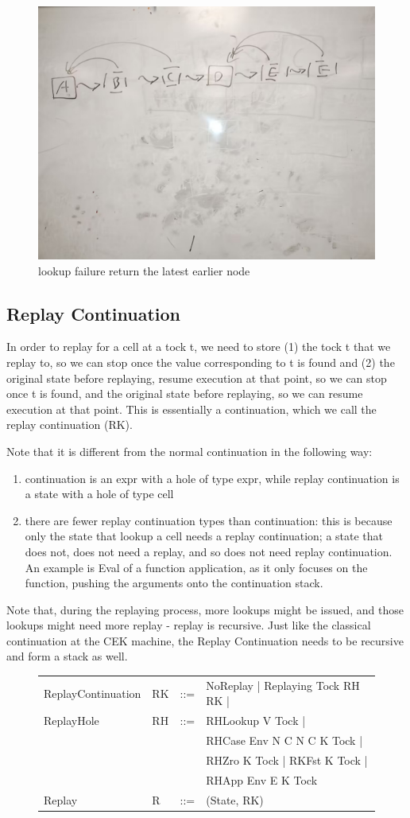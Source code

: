 \begin{figure}
    \includegraphics[width=0.5\columnwidth]{img4}
    \caption{lookup failure return the latest earlier node}
\end{figure}

\subsection{Replay Continuation}
In order to replay for a cell at a tock t, we need to store (1) the tock t that we replay to, so we can stop once the value corresponding to t is found and (2) the original state before replaying, resume execution at that point, so we can stop once t is found, and the original state before replaying, so we can resume execution at that point. 
This is essentially a continuation, which we call the replay continuation (RK).

Note that it is different from the normal continuation in the following way:
\begin{enumerate}
    \item continuation is an expr with a hole of type expr, while replay continuation is a state with a hole of type cell
    \item there are fewer replay continuation types than continuation: this is because only the state that lookup a cell needs a replay continuation; a state that does not, does not need a replay, and so does not need replay continuation. An example is Eval of a function application, as it only focuses on the function, pushing the arguments onto the continuation stack. 
\end{enumerate}

Note that, during the replaying process, more lookups might be issued, and those lookups might need more replay - replay is recursive. Just like the classical continuation at the CEK machine, the Replay Continuation needs to be recursive and form a stack as well.
\begin{figure}
    \begin{tabular}{p{10em} p{2.6em} p{1em} p{}}
        ReplayContinuation & RK & ::= & NoReplay | Replaying Tock RH RK | \\
        ReplayHole & RH & ::= & RHLookup V Tock | \\
        & & & RHCase Env N C N C K Tock | \\
        & & & RHZro K Tock | RKFst K Tock | \\
        & & & RHApp Env E K Tock \\
        Replay & R & ::= & (State, RK) \\
    \end{tabular}
\end{figure}

